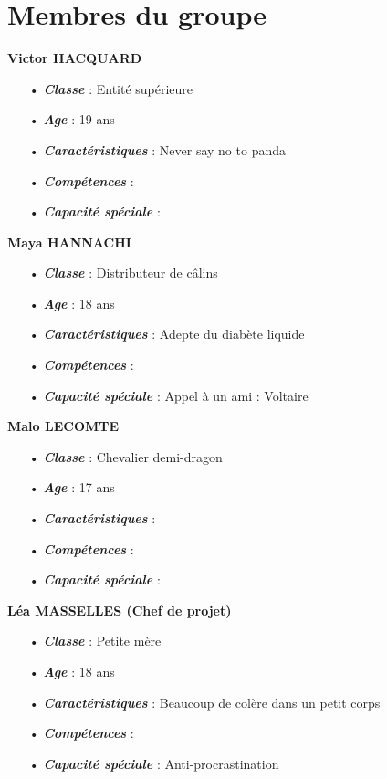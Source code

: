 \documentclass{article}
\begin{document}
\section{Membres du groupe}
\vspace{0.3cm}\hspace{-0.7cm}
\textbf{Victor HACQUARD}
\begin{itemize}
\item[•] \textbf{\textit{Classe}} : Entité supérieure
\item[•] \textbf{\textit{Age}} : 19 ans
\item[•] \textbf{\textit{Caractéristiques}} : Never say no to panda
\item[•] \textbf{\textit{Compétences}} : 
\item[•] \textbf{\textit{Capacité spéciale}} :
\end{itemize}
\vspace{0.3cm}
\textbf{Maya HANNACHI}
\begin{itemize}
\item[•] \textbf{\textit{Classe}} : Distributeur de câlins
\item[•] \textbf{\textit{Age}} : 18 ans
\item[•] \textbf{\textit{Caractéristiques}} : Adepte du diabète liquide
\item[•] \textbf{\textit{Compétences}} : 
\item[•] \textbf{\textit{Capacité spéciale}} : Appel à un ami : Voltaire
\end{itemize}
\vspace{0.3cm}
\textbf{Malo LECOMTE}
\begin{itemize}
\item[•] \textbf{\textit{Classe}} : Chevalier demi-dragon
\item[•] \textbf{\textit{Age}} : 17 ans
\item[•] \textbf{\textit{Caractéristiques}} : 
\item[•] \textbf{\textit{Compétences}} : 
\item[•] \textbf{\textit{Capacité spéciale}} :
\end{itemize}
\vspace{0.3cm}
\textbf{Léa MASSELLES (Chef de projet)}
\begin{itemize}
\item[•] \textbf{\textit{Classe}} : Petite mère
\item[•] \textbf{\textit{Age}} : 18 ans
\item[•] \textbf{\textit{Caractéristiques}} : Beaucoup de colère dans un petit corps
\item[•] \textbf{\textit{Compétences}} : 
\item[•] \textbf{\textit{Capacité spéciale}} : Anti-procrastination
\end{itemize}
\end{document}
